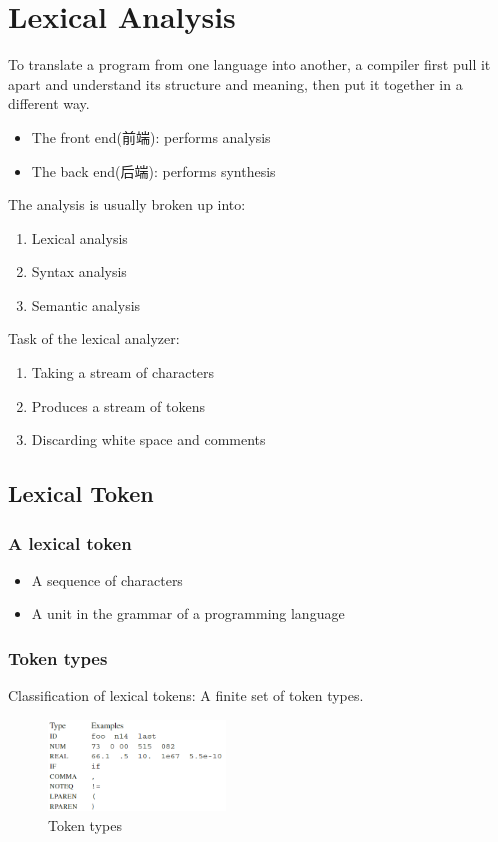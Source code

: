 \newpage
\section{Lexical Analysis}
To translate a program from one language into another, a compiler first pull it apart and understand its structure and meaning, then put it together in a different way.

\begin{itemize}
    \item The front end(前端): performs analysis
    \item The back end(后端): performs synthesis
\end{itemize}

The analysis is usually broken up into:
\begin{enumerate}
    \item Lexical analysis
    \item Syntax analysis
    \item Semantic analysis
\end{enumerate}

Task of the lexical analyzer:
\begin{enumerate}
    \item Taking a stream of characters
    \item Produces a stream of tokens
    \item Discarding white space and comments
\end{enumerate}

\subsection{Lexical Token}
\subsubsection{A lexical token}
\begin{itemize}
    \item A sequence of characters
    \item A unit in the grammar of a programming language
\end{itemize}

\subsubsection{Token types}
Classification of lexical tokens: A finite set of token types.
\begin{figure}[!htb]
    \centering
    \includegraphics[width=0.42\textwidth]{pic/CP2/Token types}
    \caption{Token types}
\end{figure}

